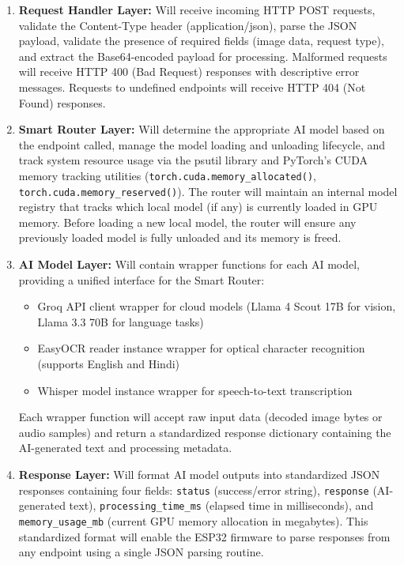 \begin{enumerate}[leftmargin=1.5cm]
\item \textbf{Request Handler Layer:} Will receive incoming HTTP POST requests, validate the Content-Type header (application/json), parse the JSON payload, validate the presence of required fields (image data, request type), and extract the Base64-encoded payload for processing. Malformed requests will receive HTTP 400 (Bad Request) responses with descriptive error messages. Requests to undefined endpoints will receive HTTP 404 (Not Found) responses.

\item \textbf{Smart Router Layer:} Will determine the appropriate AI model based on the endpoint called, manage the model loading and unloading lifecycle, and track system resource usage via the psutil library and PyTorch's CUDA memory tracking utilities (\texttt{torch.cuda.memory\_allocated()}, \texttt{torch.cuda.memory\_reserved()}). The router will maintain an internal model registry that tracks which local model (if any) is currently loaded in GPU memory. Before loading a new local model, the router will ensure any previously loaded model is fully unloaded and its memory is freed.

\item \textbf{AI Model Layer:} Will contain wrapper functions for each AI model, providing a unified interface for the Smart Router:
\begin{itemize}
\item Groq API client wrapper for cloud models (Llama 4 Scout 17B for vision, Llama 3.3 70B for language tasks)
\item EasyOCR reader instance wrapper for optical character recognition (supports English and Hindi)
\item Whisper model instance wrapper for speech-to-text transcription
\end{itemize}
Each wrapper function will accept raw input data (decoded image bytes or audio samples) and return a standardized response dictionary containing the AI-generated text and processing metadata.

\item \textbf{Response Layer:} Will format AI model outputs into standardized JSON responses containing four fields: \texttt{status} (success/error string), \texttt{response} (AI-generated text), \texttt{processing\_time\_ms} (elapsed time in milliseconds), and \texttt{memory\_usage\_mb} (current GPU memory allocation in megabytes). This standardized format will enable the ESP32 firmware to parse responses from any endpoint using a single JSON parsing routine.
\end{enumerate}
